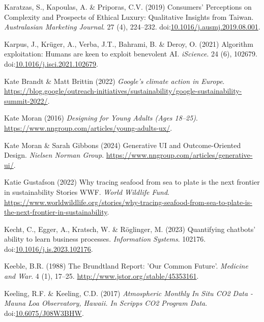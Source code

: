 \documentclass[
  letterpaper,
  DIV=11,
  numbers=noendperiod]{scrartcl}
\newlength{\cslhangindent}
\newenvironment{CSLReferences}[2] %
 {\begin{list}{}{%
  \setlength{\itemindent}{0pt}
  \setlength{\leftmargin}{0pt}
  \setlength{\parsep}{0pt}
  \ifodd #1
   \setlength{\leftmargin}{\cslhangindent}
   \setlength{\itemindent}{-1\cslhangindent}
  \fi
  \setlength{\itemsep}{#2\baselineskip}}}
 {\end{list}}
\begin{document}
\begin{CSLReferences}{0}{1}
Karatzas, S., Kapoulas, A. \& Priporas, C.V. (2019) Consumers'
{Perceptions} on {Complexity} and {Prospects} of {Ethical Luxury}:
{Qualitative Insights} from {Taiwan}. \emph{Australasian Marketing
Journal}. 27 (4), 224--232.
doi:\href{https://doi.org/10.1016/j.ausmj.2019.08.001}{10.1016/j.ausmj.2019.08.001}.

Karpus, J., Krüger, A., Verba, J.T., Bahrami, B. \& Deroy, O. (2021)
Algorithm exploitation: {Humans} are keen to exploit benevolent {AI}.
\emph{iScience}. 24 (6), 102679.
doi:\href{https://doi.org/10.1016/j.isci.2021.102679}{10.1016/j.isci.2021.102679}.

Kate Brandt \& Matt Brittin (2022) \emph{Google's climate action in
{Europe}}.
\url{https://blog.google/outreach-initiatives/sustainability/google-sustainability-summit-2022/}.

Kate Moran (2016) \emph{Designing for {Young Adults} ({Ages} 18--25)}.
\url{https://www.nngroup.com/articles/young-adults-ux/}.

Kate Moran \& Sarah Gibbons (2024) Generative {UI} and {Outcome-Oriented
Design}. \emph{Nielsen Norman Group}.
\url{https://www.nngroup.com/articles/generative-ui/}.

Katie Gustafson (2022) Why tracing seafood from sea to plate is the next
frontier in sustainability {\textbar} {Stories} {\textbar} {WWF}.
\emph{World Wildlife Fund}.
\url{https://www.worldwildlife.org/stories/why-tracing-seafood-from-sea-to-plate-is-the-next-frontier-in-sustainability}.

Kecht, C., Egger, A., Kratsch, W. \& Röglinger, M. (2023) Quantifying
chatbots' ability to learn business processes. \emph{Information
Systems}. 102176.
doi:\href{https://doi.org/10.1016/j.is.2023.102176}{10.1016/j.is.2023.102176}.

Keeble, B.R. (1988) The {Brundtland Report}: '{Our Common Future}'.
\emph{Medicine and War}. 4 (1), 17--25.
\url{http://www.jstor.org/stable/45353161}.

Keeling, R.F. \& Keeling, C.D. (2017) \emph{Atmospheric {Monthly In Situ
CO2 Data} - {Mauna Loa Observatory}, {Hawaii}. {In Scripps CO2 Program
Data}}. doi:\href{https://doi.org/10.6075/J08W3BHW}{10.6075/J08W3BHW}.


\end{CSLReferences}
\end{document}
